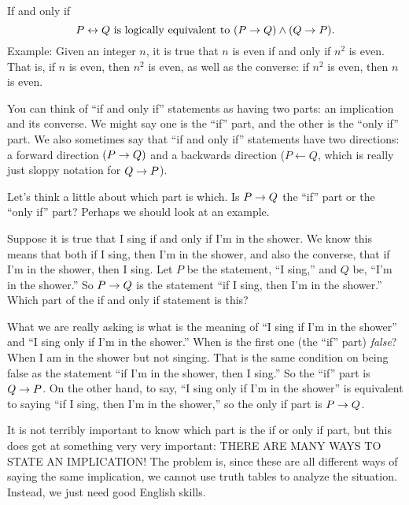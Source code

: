 \documentclass[12pt]{article}
\begin{document}
\begin{defbox}{If and only if}
\[ P \leftrightarrow Q \mbox{ is logically equivalent to } (P \rightarrow Q) \wedge (Q \rightarrow P).\]
Example: Given an integer $n$, it is true that $n$ is even if and only if $n^2$ is even.  That is, if $n$ is even, then $n^2$ is even, as well as the converse: if $n^2$ is even, then $n$ is even.
\end{defbox}

You can think of ``if and only if'' statements as having two parts: an implication and its converse.  We might say one is the ``if'' part, and the other is the ``only if'' part.  We also sometimes say that ``if and only if'' statements have two directions: a forward direction $(P \rightarrow Q)$ and a backwards direction ($P \leftarrow Q$, which is really just sloppy notation for $Q \rightarrow P$).

Let's think a little about which part is which.  Is $P \rightarrow Q$ the ``if'' part or the ``only if'' part?  Perhaps we should look at an example.

\begin{example}
 Suppose it is true that I sing if and only if I'm in the shower.  We know this means that both if I sing, then I'm in the shower, and also the converse, that if I'm in the shower, then I sing.  Let $P$ be the statement, ``I sing,'' and $Q$ be, ``I'm in the shower.''  So $P \rightarrow Q$ is the statement ``if I sing, then I'm in the shower.''  Which part of the if and only if statement is this?

 What we are really asking is what is the meaning of ``I sing if I'm in the shower'' and ``I sing only if I'm in the shower.''  When is the first one (the ``if'' part) {\em false}?  When I am in the shower but not singing.  That is the same condition on being false as the statement ``if I'm in the shower, then I sing.''  So the ``if'' part is $Q \rightarrow P$.  On the other hand, to say, ``I sing only if I'm in the shower'' is equivalent to saying ``if I sing, then I'm in the shower,'' so the only if part is $P \rightarrow Q$.
\end{example}

It is not terribly important to know which part is the if or only if part, but this does get at something very very important: THERE ARE MANY WAYS TO STATE AN IMPLICATION!  The problem is, since these are all different ways of saying the same implication, we cannot use truth tables to analyze the situation.  Instead, we just need good English skills.
\end{document}
